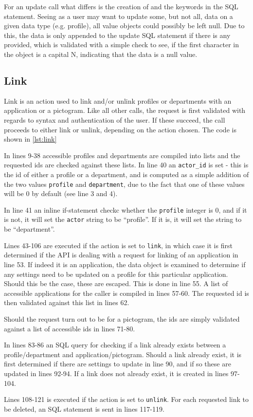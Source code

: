 For an update call  what differs is the creation of and the keywords in the SQL statement. Seeing as a user may want to update some, but not all, data on a given data type (e.g. profile), all value objects could possibly be left null. Due to this, the data is only appended to the update SQL statement if there is any provided, which is validated with a simple check to see, if the first character in the object is a capital N, indicating that the data is a null value.

\subsection{Link}
Link is an action used to link and/or unlink profiles or departments with an application or a pictogram.
Like all other calls, the request is first validated with regards to syntax and authentication of the user. If these succeed, the call proceeds to either link or unlink, depending on the action chosen. The code is shown in \autoref{lst:link}



In lines 9-38 accessible profiles and departments are compiled into lists and the requested ids are checked against these lists. In line 40 an \lstinline|actor_id| is set - this is the id of either a profile or a department, and is computed as a simple addition of the two values \lstinline|profile| and \lstinline|department|, due to the fact that one of these values will be 0 by default (see line 3 and 4). 

In line 41 an inline if-statement checkc whether the \lstinline|profile| integer is 0, and if it is not, it will set the \lstinline|actor| string to be ``profile''. If it is, it will set the string to be ``department''. 

Lines 43-106 are executed if the action is set to \lstinline|link|, in which case it is first determined if the API is dealing with a request for linking of an application in line 53. If indeed it is an application, the data object is examined to determine if any settings need to be updated on a profile for this particular application. Should this be the case, these are escaped. This is done in line 55. A list of accessible applications for the caller is compiled in lines 57-60. The requested id is then validated against this list in lines 62.

Should the request turn out to be for a pictogram, the ids are simply validated against a list of accessible ids in lines 71-80. 

In lines 83-86 an SQL query for checking if a link already exists between a profile/department and application/pictogram. Should a link already exist, it is first determined if there are settings to update in line 90, and if so these are updated in lines 92-94. If a link does not already exist, it is created in lines 97-104.

Lines 108-121 is executed if the action is set to \lstinline|unlink|. For each requested link to be deleted, an SQL statement is sent in lines 117-119.